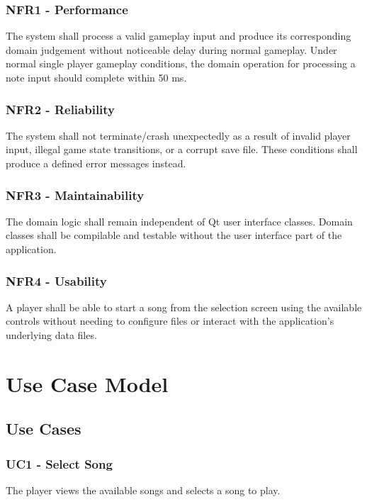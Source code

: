 \documentclass[12pt,a4paper]{article}
\begin{document}
        \subsubsection{NFR1 - Performance}
            The system shall process a valid gameplay input and produce its corresponding domain judgement
            without noticeable delay during normal gameplay.
            Under normal single player gameplay conditions, the domain operation for processing a note input should complete within
            50 ms.

        \subsubsection{NFR2 - Reliability}
            The system shall not terminate/crash unexpectedly as a result of invalid player input, illegal game state transitions, or a corrupt save file.
            These conditions shall produce a defined error messages instead.
        
        \subsubsection{NFR3 - Maintainability}
            The domain logic shall remain independent of Qt user interface classes.
            Domain classes shall be compilable and testable without the user interface part of the application.
        
        \subsubsection{NFR4 - Usability}
            A player shall be able to start a song from the selection screen using the available controls without needing to configure files or
            interact with the application's underlying data files.



\section{Use Case Model}
        \subsection{Use Cases}
            \subsubsection{UC1 - Select Song}
                The player views the available songs and selects
                a song to play.    
\end{document}
